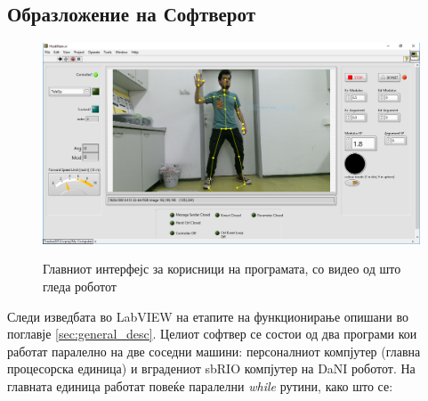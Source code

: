 \documentclass[11pt]{article}
\begin{document}
  \subsection{Образложение на Софтверот}

    \begin{figure}[H]
      \centering
      \includegraphics[width = 0.75\linewidth]{./images/pineapple_summer.png}
      \label{fig:pineapple}
      \caption{Главниот интерфејс за корисници на програмата, со видео од што гледа роботот}
    \end{figure}
    Следи изведбата во LabVIEW на етапите на функционирање опишани во поглавје \ref{sec:general_desc}. Целиот софтвер се состои од два програми кои работат паралелно на две соседни машини: персоналниот компјутер (главна процесорска единица) и вградениот sbRIO компјутер на DaNI роботот. На главната единица работат повеќе паралелни \textit{while} рутини, како што се:
\end{document}
